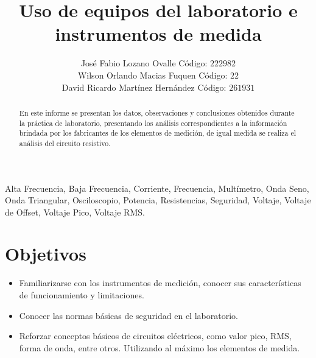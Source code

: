 \documentclass[twocolumn]{IEEEtran}
\begin{document}
\title{Uso de equipos del laboratorio e instrumentos de medida}
\author{José Fabio Lozano Ovalle Código: $222982$\\
	Wilson Orlando Macias Fuquen Código: $22$\\
	David Ricardo Martínez Hernández Código: $261931$}
\maketitle
{}
\begin{abstract}
En este informe se presentan los datos, observaciones y conclusiones obtenidos
durante la práctica de laboratorio, presentando los análisis correspondientes a
la información brindada por los fabricantes de los elementos de medición, de
igual medida se realiza el análisis del circuito resistivo.
\end{abstract}

\begin{keywords}
Alta Frecuencia, Baja Frecuencia, Corriente, Frecuencia, Multímetro, Onda Seno,
Onda Triangular, Osciloscopio, Potencia, Resistencias, Seguridad, Voltaje,
Voltaje de Offset, Voltaje Pico, Voltaje RMS.
\end{keywords}

\section{Objetivos}
\begin{itemize}
  \item Familiarizarse con los instrumentos de medición, conocer sus
características de funcionamiento y limitaciones.
  \item Conocer las normas básicas de seguridad en el laboratorio.
  \item Reforzar conceptos básicos de circuitos eléctricos, como valor pico,
RMS, forma de onda, entre otros. Utilizando al máximo los elementos de medida.
\end{itemize}
\end{document}
